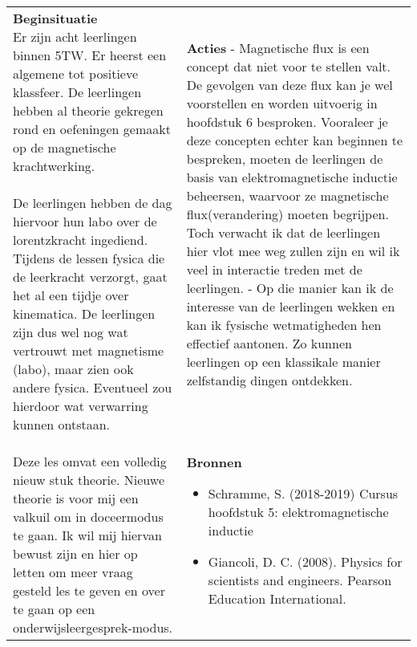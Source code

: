 \begin{landscape}
	\begin{tabularx}{1.56\textwidth}{|p{}|X|}
		\hline
		\multirow{2}{0.55\textwidth}{\textbf{Beginsituatie}\newline  
		Er zijn acht leerlingen binnen 5TW. Er heerst een algemene tot positieve klassfeer. De leerlingen hebben al theorie gekregen  rond en oefeningen gemaakt op de magnetische krachtwerking. \newline\newline De leerlingen hebben de dag hiervoor hun labo over de lorentzkracht ingediend. Tijdens de lessen fysica die de leerkracht verzorgt, gaat het al een tijdje over kinematica. De leerlingen zijn dus wel nog wat vertrouwt met magnetisme (labo), maar zien ook andere fysica. Eventueel zou hierdoor wat verwarring kunnen ontstaan. \newline\newline Deze les omvat een volledig nieuw stuk theorie. Nieuwe theorie is voor mij een valkuil om in doceermodus te gaan. Ik wil mij hiervan bewust zijn en hier op letten om meer vraag gesteld les te geven en over te gaan op een onderwijsleergesprek-modus.} & \textbf{Acties}\newline\newline  
		- Magnetische flux is een concept dat niet voor te stellen valt. De gevolgen van deze flux kan je wel voorstellen en worden uitvoerig in hoofdstuk 6 besproken. Vooraleer je deze concepten echter kan beginnen te bespreken, moeten de leerlingen de basis van elektromagnetische inductie beheersen, waarvoor ze magnetische flux(verandering) moeten begrijpen. Toch verwacht ik dat de leerlingen hier vlot mee weg zullen zijn en wil ik veel in interactie treden met de leerlingen. \newline\newline
		- \GreenHighlight{Via demo's wil ik bepaalde onderwerpen starten.}{9cm}	Op die manier kan ik de interesse van de leerlingen wekken en kan ik fysische wetmatigheden hen effectief aantonen. Zo kunnen leerlingen op een klassikale manier zelfstandig dingen ontdekken.	
		\newline\newline\newline\newline
		
		\\ \cline{2-2}
		  & \textbf{Bronnen}\begin{itemize}
		  	\item Schramme, S. (2018-2019) Cursus hoofdstuk 5: elektromagnetische inductie
		  	\item Giancoli, D. C. (2008). Physics for scientists and engineers. Pearson Education International.
		  \end{itemize}\\ \hline
	\end{tabularx}



\end{landscape}
